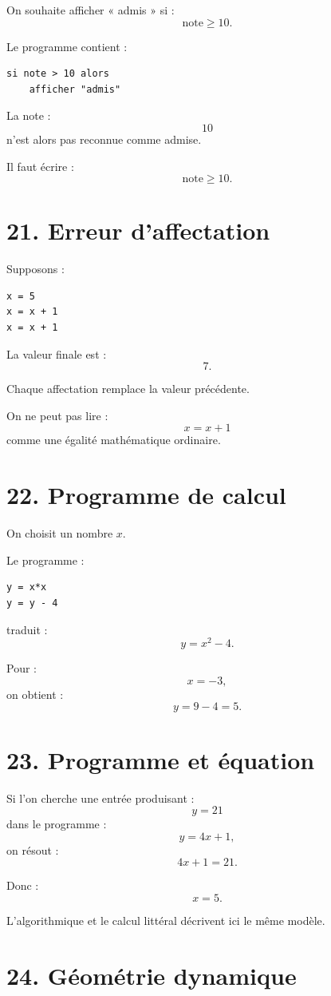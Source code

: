 On souhaite afficher « admis » si :
\[
\text{note}\ge10.
\]

Le programme contient :
\begin{verbatim}
si note > 10 alors
    afficher "admis"
\end{verbatim}

La note :
\[
10
\]
n'est alors pas reconnue comme admise.

Il faut écrire :
\[
\text{note}\ge10.
\]

\section{21. Erreur d'affectation}

Supposons :
\begin{verbatim}
x = 5
x = x + 1
x = x + 1
\end{verbatim}

La valeur finale est :
\[
7.
\]

Chaque affectation remplace la valeur précédente.

On ne peut pas lire :
\[
x=x+1
\]
comme une égalité mathématique ordinaire.

\section{22. Programme de calcul}

On choisit un nombre $x$.

Le programme :
\begin{verbatim}
y = x*x
y = y - 4
\end{verbatim}

traduit :
\[
y=x^2-4.
\]

Pour :
\[
x=-3,
\]
on obtient :
\[
y=9-4=5.
\]

\section{23. Programme et équation}

Si l'on cherche une entrée produisant :
\[
y=21
\]
dans le programme :
\[
y=4x+1,
\]
on résout :
\[
4x+1=21.
\]

Donc :
\[
x=5.
\]

L'algorithmique et le calcul littéral décrivent ici le même modèle.

\section{24. Géométrie dynamique}

